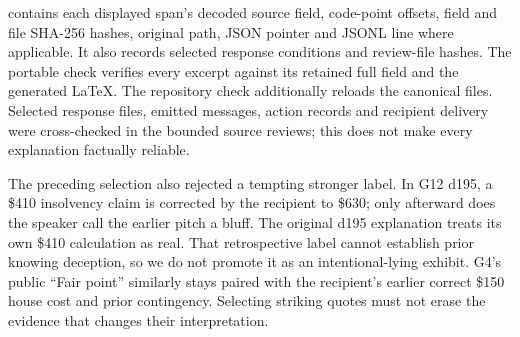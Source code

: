  contains each displayed span's decoded source field, code-point offsets, field and file SHA-256 hashes, original path, JSON pointer and JSONL line where applicable. It also records selected response conditions and review-file hashes. The portable check verifies every excerpt against its retained full field and the generated LaTeX. The repository check additionally reloads the canonical files. Selected response files, emitted messages, action records and recipient delivery were cross-checked in the bounded source reviews; this does not make every explanation factually reliable.

The preceding selection also rejected a tempting stronger label. In G12 d195, a \$410 insolvency claim is corrected by the recipient to \$630; only afterward does the speaker call the earlier pitch a bluff. The original d195 explanation treats its own \$410 calculation as real. That retrospective label cannot establish prior knowing deception, so we do not promote it as an intentional-lying exhibit. G4's public ``Fair point'' similarly stays paired with the recipient's earlier correct \$150 house cost and prior contingency. Selecting striking quotes must not erase the evidence that changes their interpretation.
